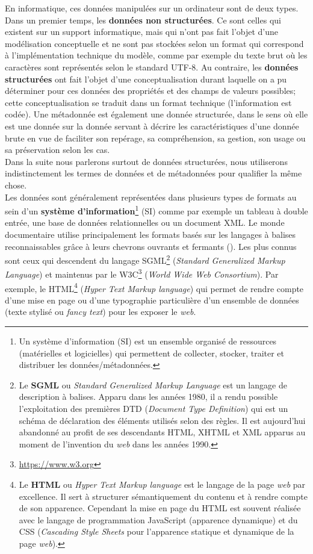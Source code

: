En informatique, ces données manipulées sur un ordinateur sont de deux types. Dans un premier temps, les \textbf{données non structurées}. Ce sont celles qui existent sur un support informatique, mais qui n'ont pas fait l'objet d'une modélisation conceptuelle et ne sont pas stockées selon un format qui correspond à l'implémentation technique du modèle, comme par exemple du texte brut où les caractères sont représentés selon le standard UTF-8. Au contraire, les \textbf{données structurées} ont fait l'objet d'une conceptualisation durant laquelle on a pu déterminer pour ces données des propriétés et des champs de valeurs possibles; cette conceptualisation se traduit dans un format technique (l'information est codée). Une métadonnée est également une donnée structurée, dans le sens où elle est une donnée sur la donnée servant à décrire les caractéristiques d'une donnée brute en vue de faciliter son repérage, sa compréhension, sa gestion, son usage ou sa préservation selon les cas.\\

Dans la suite nous parlerons surtout de données structurées, nous utiliserons indistinctement les termes de données et de métadonnées pour qualifier la même chose.\\ 

Les données sont généralement représentées dans plusieurs types de formats au sein d'un \textbf{système d'information}\footnote{Un système d'information (SI) est un ensemble organisé de ressources (matérielles et logicielles) qui permettent de collecter, stocker, traiter et distribuer les données/métadonnées.} (SI) comme par exemple un tableau à double entrée, une base de données relationnelles ou un document XML. Le monde documentaire utilise principalement les formats basés sur les langages à balises reconnaissables grâce à leurs chevrons ouvrants et fermants (\citecode{< >}). Les plus connus sont ceux qui descendent du langage SGML\footnote{Le \textbf{SGML} ou \textit{Standard Generalized Markup Language} est un langage de description à balises. Apparu dans les années 1980, il a rendu possible l'exploitation des premières DTD (\textit{Document Type Definition}) qui est un schéma de déclaration des éléments utilisés selon des règles. Il est aujourd'hui abandonné au profit de ses descendants HTML, XHTML et XML apparus au moment de l'invention du \textit{web} dans les années 1990.} (\textit{Standard Generalized Markup Language}) et maintenus par le W3C\footnote{\url{https://www.w3.org}} (\textit{World Wide Web Consortium}). Par exemple, le HTML\footnote{Le \textbf{HTML} ou \textit{Hyper Text Markup language} est le langage de la page \textit{web} par excellence. Il sert à structurer sémantiquement du contenu et à rendre compte de son apparence. Cependant la mise en page du HTML est souvent réalisée avec le langage de programmation JavaScript (apparence dynamique) et du CSS (\textit{Cascading Style Sheets} pour l'apparence statique et dynamique de la page \textit{web}).} (\textit{Hyper Text Markup language}) qui permet de rendre compte d'une mise en page ou d'une typographie particulière d'un ensemble de données (texte stylisé ou \textit{fancy text}) pour les exposer le \textit{web}.\\

